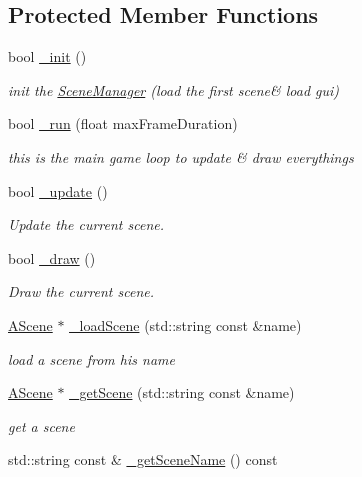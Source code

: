 \subsection*{Protected Member Functions}
\begin{DoxyCompactItemize}
\item 
bool \hyperlink{class_scene_manager_a3dd5f5c63c893508ddb701d19533a0c6}{\+\_\+init} ()
\begin{DoxyCompactList}\small\item\em init the \hyperlink{class_scene_manager}{Scene\+Manager} (load the first scene\& load gui) \end{DoxyCompactList}\item 
bool \hyperlink{class_scene_manager_a551147ff34683483b9face928dd24564}{\+\_\+run} (float max\+Frame\+Duration)
\begin{DoxyCompactList}\small\item\em this is the main game loop to update \& draw everythings \end{DoxyCompactList}\item 
bool \hyperlink{class_scene_manager_af57dd8e436c025bdeb7c2ec751b62ba9}{\+\_\+update} ()
\begin{DoxyCompactList}\small\item\em Update the current scene. \end{DoxyCompactList}\item 
bool \hyperlink{class_scene_manager_adc10bb1fde4ed648080de309e69331c9}{\+\_\+draw} ()
\begin{DoxyCompactList}\small\item\em Draw the current scene. \end{DoxyCompactList}\item 
\hyperlink{class_a_scene}{A\+Scene} $\ast$ \hyperlink{class_scene_manager_a9209f024c89479aab57bf3277c86a584}{\+\_\+load\+Scene} (std\+::string const \&name)
\begin{DoxyCompactList}\small\item\em load a scene from his name \end{DoxyCompactList}\item 
\hyperlink{class_a_scene}{A\+Scene} $\ast$ \hyperlink{class_scene_manager_ac0599b120f0aa835792d9679e62f8522}{\+\_\+get\+Scene} (std\+::string const \&name)
\begin{DoxyCompactList}\small\item\em get a scene \end{DoxyCompactList}\item 
std\+::string const  \& \hyperlink{class_scene_manager_adfeeb557f7324390b86befdd4bb66daa}{\+\_\+get\+Scene\+Name} () const

\end{DoxyCompactItemize}
